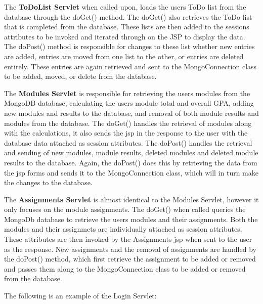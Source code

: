 \par The \textbf{ToDoList Servlet} when called upon, loads the users ToDo list from the database through the doGet() method. The doGet() also retrieves the ToDo list that is completed from the database. These lists are then added to the sessions attributes to be invoked and iterated through on the JSP to display the data. The doPost() method is responsible for changes to these list whether new entries are added, entries are moved from one list to the other, or entries are deleted entirely. These entries are again retrieved and sent to the MongoConnection class to be added, moved, or delete from the database.\\

\par The \textbf{Modules Servlet} is responsible for retrieving the users modules from the MongoDB database, calculating the users module total and overall GPA, adding new modules and results to the database, and removal of both module results and modules from the database. The doGet() handles the retrieval of modules along with the calculations, it also sends the jsp in the response to the user with the database data attached as session attributes. The doPost() handles the retrieval and sending of new modules, module results, deleted modules and deleted module results to the database. Again, the doPost() does this by retrieving the data from the jsp forms and sends it to the MongoConnection class, which will in turn make the changes to the database.\\

\par The \textbf{Assignments Servlet} is almost identical to the Modules Servlet, however it only focuses on the module assignments. The doGet() when called queries the MongoDb database to retrieve the users modules and their assignments. Both the modules and their assignmets are individually attached as session attributes. These attributes are then invoked by the Assignments jsp when sent to the user as the response. New assignments and the removal of assignments are handled by the doPost() method, which first retrieve the assignment to be added or removed and passes them along to the MongoConnection class to be added or removed from the database.\\

\par The following is an example of the Login Servlet:

